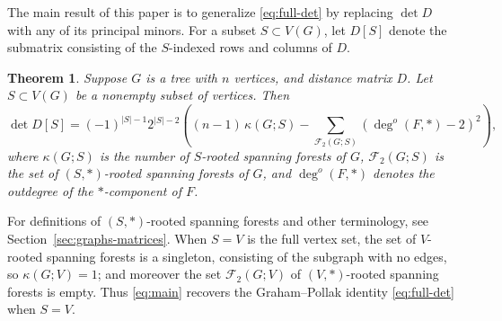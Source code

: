 \documentclass{amsart}
\newtheorem{thm}{Theorem}
\theoremstyle{definition}
\newcommand{\forests}{\mathcal{F}}
\newcommand{\degout}{\deg^o}
\begin{document}
The main result of this paper is to generalize \eqref{eq:full-det} by replacing $\det D$ with any of its principal minors.
For a subset $S \subset V(G)$, let $D[S]$ denote the submatrix consisting of the $S$-indexed rows and columns of $D$.
\begin{thm}
\label{thm:main}
Suppose $G$ is a tree with $n$ vertices, 
and distance matrix $D$.
Let $S \subset V(G)$ be a nonempty subset of vertices.
Then
\begin{equation}\label{eq:main}
\det D[S] = (-1)^{|S|-1} 2^{|S|-2} \left( (n-1)\, \kappa(G;S)  - \sum_{\mathcal F_2(G;S)} \left(\degout(F,*) - 2\right)^2  \right),
\end{equation}
where 
$\kappa(G;S)$ is the number of $S$-rooted spanning forests of $G$,
$\forests_2(G;S)$ is the set of $(S,*)$-rooted spanning forests of $G$,
and
$\degout(F,*)$ denotes the outdegree of the $*$-component of $F$.
\end{thm}
For definitions of $(S,*)$-rooted spanning forests and other terminology, see Section~\ref{sec:graphs-matrices}.
When $S = V$ is the full vertex set, the set of $V$-rooted spanning forests is a singleton, consisting of the subgraph with no edges, 
so $\kappa(G; V) = 1$; and moreover the set $\forests_2(G; V)$ of $(V, *)$-rooted spanning forests is empty. 
Thus \eqref{eq:main} recovers the Graham--Pollak identity \eqref{eq:full-det} when $S = V$.
\end{document}
